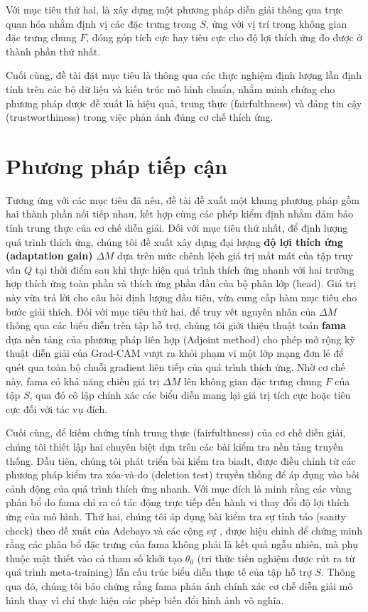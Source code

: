 Với mục tiêu thứ hai, là xây dựng một phương pháp diễn giải thông qua trực quan hóa nhằm định vị các đặc trưng trong $S$, ứng với vị trí trong không gian đặc trưng chung $F$, đóng góp tích cực hay tiêu cực cho độ lợi thích ứng đo được ở thành phần thứ nhất.

Cuối cùng, đề tài đặt mục tiêu là thông qua các thực nghiệm định lượng lẫn định tính trên các bộ dữ liệu và kiến trúc mô hình chuẩn, nhằm minh chứng cho phương pháp được đề xuất là hiệu quả, trung thực (fairfulthness) và đáng tin cậy (trustworthiness) trong việc phản ánh đúng cơ chế thích ứng.

\section{Phương pháp tiếp cận}
\label{sec:proposed_method}

Tương ứng với các mục tiêu đã nêu, đề tài đề xuất một khung phương pháp gồm hai thành phần nối tiếp nhau, kết hợp cùng các phép kiểm định nhằm đảm bảo tính trung thực của cơ chế diễn giải. Đối với mục tiêu thứ nhất, để định lượng quá trình thích ứng, chúng tôi đề xuất xây dựng đại lượng \textbf{độ lợi thích ứng (adaptation gain)} $\Delta M$ dựa trên mức chênh lệch giá trị mất mát của tập truy vấn $Q$ tại thời điểm sau khi thực hiện quá trình thích ứng nhanh với hai trường hợp thích ứng toàn phần và thích ứng phần đầu của bộ phân lớp (head). Giá trị này vừa trả lời cho câu hỏi định lượng đầu tiên, vừa cung cấp hàm mục tiêu cho bước giải thích. Đối với mục tiêu thứ hai, để truy vết nguyên nhân của $\Delta M$ thông qua các biểu diễn trên tập hỗ trợ, chúng tôi giới thiệu thuật toán \textbf{\acrfull{fama}} dựa nền tảng của phương pháp liên hợp (Adjoint method) cho phép mở rộng kỹ thuật diễn giải của Grad-CAM vượt ra khỏi phạm vi một lớp mạng đơn lẻ để quét qua toàn bộ chuỗi gradient liên tiếp của quá trình thích ứng. Nhờ cơ chế này, \acrshort{fama} có khả năng chiếu giá trị $\Delta M$ lên không gian đặc trưng chung $F$ của tập $S$, qua đó cô lập chính xác các biểu diễn mang lại giá trị tích cực hoặc tiêu cực đối với tác vụ đích.

Cuối cùng, để kiếm chứng tính trung thực (fairfulthness) của cơ chế diễn giải, chúng tôi thiết lập hai chuyên biệt dựa trên các bài kiểm tra nền tảng truyền thống. Đầu tiên, chúng tôi phát triển bài kiểm tra \acrfull{biadt}, được điều chỉnh từ các phương pháp kiểm tra xóa-và-đo (deletion test) truyền thống để áp dụng vào bối cảnh động của quá trình thích ứng nhanh. Với mục đích là minh rằng các vùng phân bổ do \acrshort{fama} chỉ ra có tác động trực tiếp đến hành vi thay đổi độ lợi thích ứng của mô hình. Thứ hai, chúng tôi áp dụng bài kiểm tra sự tỉnh táo (sanity check) theo đề xuất của Adebayo và các cộng sự \cite{adebayo2018sanity}, được hiệu chỉnh để chứng minh rằng các phân bổ đặc trưng của \acrshort{fama} không phải là kết quả ngẫu nhiên, mà phụ thuộc mật thiết vào cả tham số khởi tạo $\theta_0$ (tri thức tiền nghiệm được rút ra từ quá trình meta-training) lẫn cấu trúc biểu diễn thực tế của tập hỗ trợ $S$. Thông qua đó, chúng tôi bảo chứng rằng \acrshort{fama} phản ánh chính xác cơ chế diễn giải mô hình thay vì chỉ thực hiện các phép biến đổi hình ảnh vô nghĩa.

